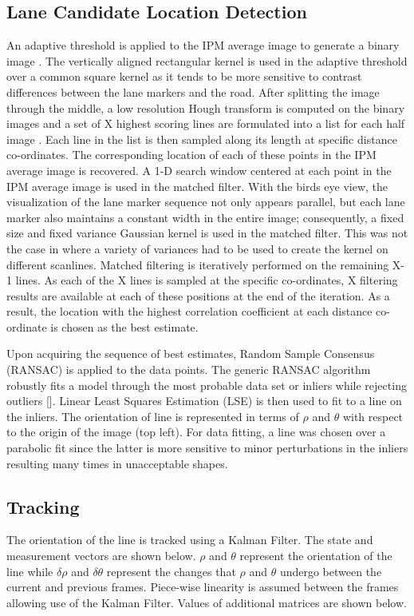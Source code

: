 \documentclass{article}
\begin{document}
\subsection{Lane Candidate Location Detection}
An adaptive threshold is applied to the IPM average image to generate a binary image \cite{borkar_layered_2009}. The vertically aligned rectangular kernel is used in the adaptive threshold over a common square kernel as it tends to be more sensitive to contrast differences between the lane markers and the road. After splitting the image through the middle, a low resolution Hough transform is computed on the binary images and a set of X highest scoring lines are formulated into a list for each half image \cite{borkar_layered_2009}. Each line in the list is then sampled along its length at specific distance co-ordinates. The corresponding location of each of these points in the IPM average image is recovered. A 1-D search window centered at each point in the IPM average image is used in the matched filter. With the birds eye view, the visualization of the lane marker sequence not only appears parallel, but each lane marker also maintains a constant width in the entire image; consequently, a fixed size and fixed variance Gaussian kernel is used in the matched filter. This was not the case in \cite{borkar_layered_2009} where a variety of variances had to be used to create the kernel on different scanlines. Matched filtering is iteratively performed on the remaining X-1 lines. As each of the X lines is sampled at the specific co-ordinates, X filtering results are available at each of these positions at the end of the iteration. As a result, the location with the highest correlation coefficient at each distance co-ordinate is chosen as the best estimate.

Upon acquiring the sequence of best estimates, Random Sample Consensus (RANSAC) is applied to the data points. The generic RANSAC algorithm robustly fits a model through the most probable data set or inliers while rejecting outliers []. Linear Least Squares Estimation (LSE) is then used to fit to a line on the inliers. The orientation of line is represented in terms of $\rho$ and $\theta$ with respect to the origin of the image (top left). For data fitting, a line was chosen over a parabolic fit since the latter is more sensitive to minor perturbations in the inliers resulting many times in unacceptable shapes.

\subsection{Tracking}
The orientation of the line is tracked using a Kalman Filter. The state and measurement vectors are shown below. $\rho$ and $\theta$ represent the orientation of the line while $\delta\rho$ and $\delta\theta$ represent the changes that $\rho$ and $\theta$ undergo between the current and previous frames. Piece-wise linearity is assumed between the frames allowing use of the Kalman Filter. Values of additional matrices are shown below.
\end{document}
